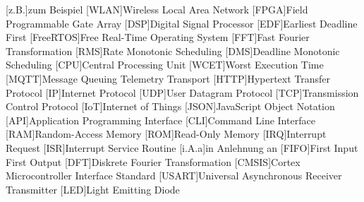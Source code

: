 \documentclass[../EDF Master Thesis.tex]{subfiles}
\begin{document}
    \begin{acronym}[abkuerzungen]
        [z.B.]{zum Beispiel}
        [WLAN]{Wireless Local Area Network}
        [FPGA]{Field Programmable Gate Array}
        [DSP]{Digital Signal Processor}
        [EDF]{Earliest Deadline First}
        [FreeRTOS]{Free Real-Time Operating System}
        [FFT]{Fast Fourier Transformation}
        [RMS]{Rate Monotonic Scheduling}
        [DMS]{Deadline Monotonic Scheduling}
        [CPU]{Central Processing Unit}
        [WCET]{Worst Execution Time}
        [MQTT]{Message Queuing Telemetry Transport}
        [HTTP]{Hypertext Transfer Protocol}
        [IP]{Internet Protocol}
        [UDP]{User Datagram Protocol}
        [TCP]{Transmission Control Protocol}
        [IoT]{Internet of Things}
        [JSON]{JavaScript Object Notation}
        [API]{Application Programming Interface}
        [CLI]{Command Line Interface}
        [RAM]{Random-Access Memory}
        [ROM]{Read-Only Memory}
        [IRQ]{Interrupt Request}
        [ISR]{Interrupt Service Routine}
        [i.A.a]{in Anlehnung an}
        [FIFO]{First Input First Output}
        [DFT]{Diskrete Fourier Transformation}
        [CMSIS]{Cortex Microcontroller Interface Standard}
        [USART]{Universal Asynchronous Receiver Transmitter}
        [LED]{Light Emitting Diode}
	\end{acronym}
\end{document}
